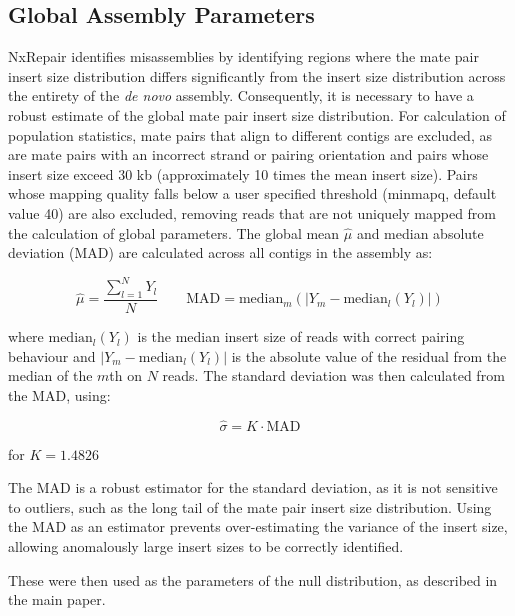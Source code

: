 \subsection*{Global Assembly Parameters}
NxRepair identifies misassemblies by identifying regions where the mate pair insert size distribution differs significantly from the insert size distribution across the entirety of the \textit{de novo} assembly. Consequently, it is necessary to have a robust estimate of the global mate pair insert size distribution. For calculation of population statistics, mate pairs that align to different contigs are excluded, as are mate pairs with an incorrect strand or pairing orientation and pairs whose insert size exceed 30 kb (approximately 10 times the mean insert size). Pairs whose mapping quality falls below a user specified threshold (minmapq, default value 40) are also excluded, removing reads that are not uniquely mapped from the calculation of global parameters. The global mean $\hat{\mu}$ and median absolute deviation ($\text{MAD}$) are calculated across all contigs in the assembly as:

\begin{equation}
\hat{\mu} = \frac{\sum_{l=1}^N Y_l}{N} \qquad \text{MAD} = \text{median}_m(|Y_m - \text{median}_l(Y_l)|)
\label{eq:global}
\end{equation}

where $\text{median}_l(Y_l)$ is the median insert size of reads with correct pairing behaviour and $|Y_m - \text{median}_l(Y_l)|$ is the absolute value of the residual from the median of the $m$th on $N$ reads. The standard deviation was then calculated from the MAD, using:

\begin{equation}
\hat{\sigma} = K \cdot \text{MAD}
\label{eq:mad_to_sigma}
\end{equation}

for $K = 1.4826$

The $\text{MAD}$ is a robust estimator for the standard deviation, as it is not sensitive to outliers, such as the long tail of the mate pair insert size distribution. Using the MAD as an estimator prevents over-estimating the variance of the insert size, allowing anomalously large insert sizes to be correctly identified.

These were then used as the parameters of the null distribution, as described in the main paper.

